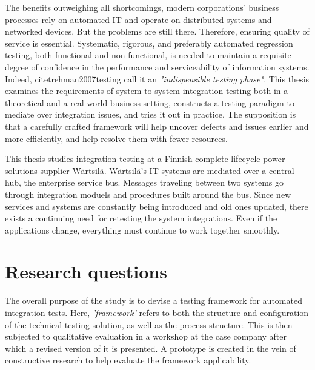 \documentclass[12pt,a4paper,oneside,pdftex]{report}
\begin{document}
The benefits outweighing all shortcomings, modern corporations' business processes rely on automated IT and operate on distributed systems and networked devices. But the problems are still there. Therefore, ensuring quality of service is essential. Systematic, rigorous, and preferably automated regression testing, both functional and non-functional, is needed to maintain a requisite degree of confidence in the performance and serviceability of information systems. Indeed, citet{rehman2007testing} call it an \emph{"indispensible testing phase"}. This thesis examines the requirements of system-to-system integration testing both in a theoretical and a real world business setting, constructs a testing paradigm to mediate over integration issues, and tries it out in practice. The supposition is that a carefully crafted framework will help uncover defects and issues earlier and more efficiently, and help resolve them with fewer resources.

This thesis studies integration testing at a Finnish complete lifecycle power solutions supplier Wärtsilä. Wärtsilä's IT systems are mediated over a central hub, the enterprise service bus. Messages traveling between two systems go through integration moduels and procedures built around the bus. Since new services and systems are constantly being introduced and old ones updated, there exists a continuing need for retesting the system integrations. Even if the applications change, everything must continue to work together smoothly. 


\section{Research questions}

The overall purpose of the study is to devise a testing framework for automated integration tests. Here, \emph{'framework'} refers to both the structure and configuration of the technical testing solution, as well as the process structure. This is then subjected to qualitative evaluation in a workshop at the case company after which a revised version of it is presented. A prototype is created in the vein of constructive research to help evaluate the framework applicability.
\end{document}
